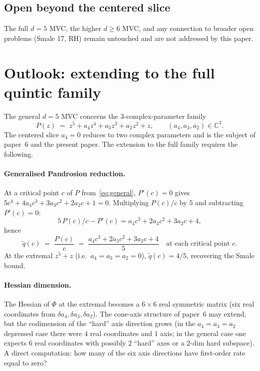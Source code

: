\documentclass[11pt,a4paper]{article}
\begin{document}
\subsection*{Open beyond the centered slice}

The full $d=5$ MVC, the higher $d\ge 6$ MVC, and any connection to
broader open problems (Smale 17, RH) remain untouched and are not
addressed by this paper.

\section{Outlook: extending to the full quintic family}
\label{sec:outlook}

The general $d=5$ MVC concerns the $3$-complex-parameter family
\begin{equation}
P(z) \;=\; z^5 + a_4 z^4 + a_3 z^3 + a_2 z^2 + z, \qquad
(a_4,a_3,a_2)\in\mathbb{C}^3.
\label{eq:general}
\end{equation}
The centered slice $a_4=0$ reduces to two complex parameters and is
the subject of paper~6 and the present paper. The extension to the
full family requires the following.

\paragraph{Generalised Pandrosion reduction.}
At a critical point $c$ of $P$ from~\eqref{eq:general}, $P'(c)=0$
gives $5c^4+4a_4 c^3+3a_3 c^2+2a_2 c + 1=0$. Multiplying $P(c)/c$ by
$5$ and subtracting $P'(c) = 0$:
\begin{equation}
5\,P(c)/c - P'(c) = a_4 c^3 + 2a_3 c^2 + 3a_2 c + 4,
\end{equation}
hence
\begin{equation}
\boxed{\;
\widetilde q(c) \;=\; \frac{P(c)}{c} \;=\; \frac{a_4 c^3 + 2a_3 c^2 + 3a_2 c + 4}{5}
\quad\text{at each critical point } c.
\;}
\label{eq:qtil-general}
\end{equation}
At the extremal $z^5+z$ (i.e.\ $a_4=a_3=a_2=0$), $\widetilde q(c)
= 4/5$, recovering the Smale bound.

\paragraph{Hessian dimension.}
The Hessian of $\Phi$ at the extremal becomes a $6\times 6$ real
symmetric matrix (six real coordinates from
$\delta a_4, \delta a_3, \delta a_2$). The cone-axis structure of
paper~6 may extend, but the codimension of the ``hard'' axis
direction grows (in the $a_4=a_3=a_2$ depressed case there were $4$
real coordinates and $1$ axis; in the general case one expects
$6$ real coordinates with possibly $2$ ``hard'' axes or a $2$-dim hard
subspace). A direct computation: how many of the six axis directions
have first-order rate equal to zero?
\end{document}
